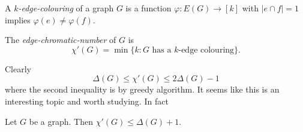 \documentclass[a4paper]{article}
\begin{document}
\begin{definition}
  A \emph{\(k\)-edge-colouring} of a graph \(G\) is a function \(\varphi: E(G) \to [k]\) with \(|e \cap f| = 1\) implies \(\varphi(e) \neq \varphi(f)\).

  The \emph{edge-chromatic-number} of \(G\) is
  \[
    \chi'(G) = \min \{k: G \text{ has a \(k\)-edge colouring}\}.
  \]
\end{definition}

Clearly
\[
  \Delta(G) \leq \chi'(G) \leq 2\Delta(G) - 1
\]
where the second inequality is by greedy algorithm. It seems like this is an interesting topic and worth studying. In fact

\begin{theorem}[Vizing]
  Let \(G\) be a graph. Then \(\chi'(G) \leq \Delta(G) + 1\).
\end{theorem}
\end{document}
